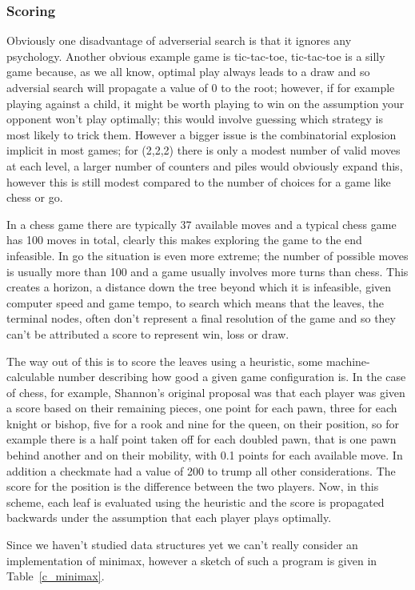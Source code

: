 \documentclass[11pt,a4paper]{scrartcl}
\begin{document}
{\subsubsection*{Scoring}
Obviously one disadvantage of adverserial search is that it ignores
any psychology. Another obvious example game is tic-tac-toe,
tic-tac-toe is a silly game because, as we all know, optimal play
always leads to a draw and so adversial search will propagate a value
of 0 to the root; however, if for example playing against a child, it
might be worth playing to win on the assumption your opponent won't
play optimally; this would involve guessing which strategy is most
likely to trick them. However a bigger issue is the combinatorial
explosion implicit in most games; for (2,2,2) there is only a modest
number of valid moves at each level, a larger number of counters and
piles would obviously expand this, however this is still modest
compared to the number of choices for a game like chess or go.

In a chess game there are typically 37 available moves and a typical
chess game has 100 moves in total, clearly this makes exploring the
game to the end infeasible. In go the situation is even more extreme;
the number of possible moves is usually more than 100 and a game
usually involves more turns than chess. This creates a horizon, a
distance down the tree beyond which it is infeasible, given computer
speed and game tempo, to search which means that the leaves, the
terminal nodes, often don't represent a final resolution of the game
and so they can't be attributed a score to represent win, loss or
draw.

The way out of this is to score the leaves using a heuristic, some
machine-calculable number describing how good a given game
configuration is. In the case of chess, for example, Shannon's
original proposal was that each player was given a score based on
their remaining pieces, one point for each pawn, three for each knight
or bishop, five for a rook and nine for the queen, on their position,
so for example there is a half point taken off for each doubled pawn,
that is one pawn behind another and on their mobility, with 0.1 points
for each available move. In addition a checkmate had a value of 200 to
trump all other considerations. The score for the position is the
difference between the two players. Now, in this scheme, each leaf is
evaluated using the heuristic and the score is propagated backwards
under the assumption that each player plays optimally.

Since we haven't studied data structures yet we can't really consider
an implementation of minimax, however a sketch of such a program is
given in Table~\ref{c_minimax}.
   
}
\end{document}
